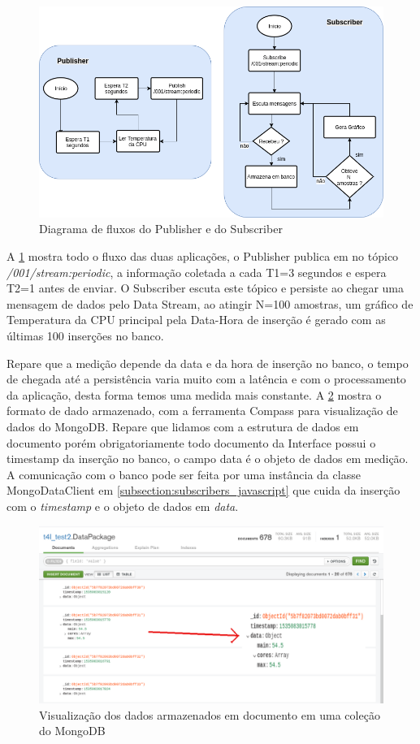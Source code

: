\begin{figure}[h!]
\centering
\includegraphics[width=11.5cm]{./02_Capitulos/02_Cap4/figures/fluxo_controle_temp}
\caption{Diagrama de fluxos do Publisher e do Subscriber}
\label{fig:4.1.0/fluxo_controle_temp}
\end{figure}

A \ref{fig:4.1.0/fluxo_controle_temp} mostra todo o fluxo das duas aplicações, o Publisher publica em no tópico \textit{/001/stream:periodic}, a informação coletada a cada T1=3 segundos e espera T2=1 antes de enviar. O Subscriber escuta este tópico e persiste ao chegar uma mensagem de dados pelo Data Stream, ao atingir N=100 amostras, um gráfico de Temperatura da CPU principal pela Data-Hora de inserção é gerado com as últimas 100 inserções no banco.


Repare que a medição depende da data e da hora de inserção no banco, o tempo de chegada até a persistência varia muito com a latência e com o processamento da aplicação, desta forma temos uma medida mais constante. A \ref{fig:4.1.0/compass} mostra o formato de dado armazenado, com a ferramenta Compass para visualização de dados do MongoDB. Repare que lidamos com a estrutura de dados em documento porém obrigatoriamente todo documento da Interface possui o timestamp da inserção no banco, o campo data é o objeto de dados em medição. A comunicação com o banco pode ser feita por uma instância da classe MongoDataClient em   \ref{subsection:subscribers_javascript} que cuida da inserção com  o \textit{timestamp} e o objeto de dados em \textit{data}.

\begin{figure}[h!]
\centering
\includegraphics[width=15cm]{./02_Capitulos/02_Cap4/figures/compass}
\caption{Visualização dos dados armazenados em documento em uma coleção do MongoDB}
\label{fig:4.1.0/compass}
\end{figure}

